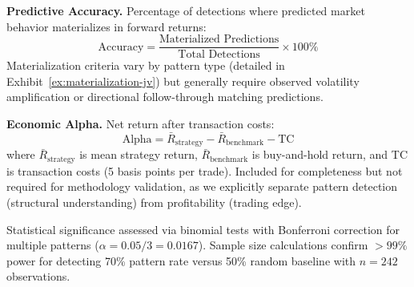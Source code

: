 \textbf{Predictive Accuracy.} Percentage of detections where predicted market behavior materializes in forward returns:
\begin{equation}
\text{Accuracy} = \frac{\text{Materialized Predictions}}{\text{Total Detections}} \times 100\%
\end{equation}
Materialization criteria vary by pattern type (detailed in Exhibit~\ref{ex:materialization-jv}) but generally require observed volatility amplification or directional follow-through matching predictions.

\medskip
\textbf{Economic Alpha.} Net return after transaction costs:
\begin{equation}
\text{Alpha} = \bar{R}_{\text{strategy}} - \bar{R}_{\text{benchmark}} - \text{TC}
\end{equation}
where $\bar{R}_{\text{strategy}}$ is mean strategy return, $\bar{R}_{\text{benchmark}}$ is buy-and-hold return, and TC is transaction costs (5 basis points per trade). Included for completeness but not required for methodology validation, as we explicitly separate pattern detection (structural understanding) from profitability (trading edge).

Statistical significance assessed via binomial tests with Bonferroni correction for multiple patterns ($\alpha = 0.05/3 = 0.0167$). Sample size calculations confirm $>99\%$ power for detecting 70\% pattern rate versus 50\% random baseline with $n=242$ observations.
